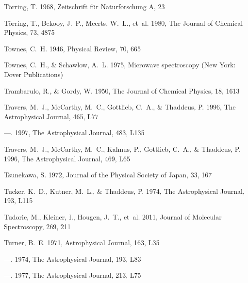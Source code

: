 \documentclass[twocolumn]{aastex631}
\begin{document}
\begin{thebibliography}{}
T{\"o}rring, T. 1968, Zeitschrift f{\"u}r Naturforschung A, 23

T{\"o}rring, T., Bekooy, J.~P., Meerts, W.~L., {et~al.} 1980, The Journal of
  Chemical Physics, 73, 4875

Townes, C.~H. 1946, Physical Review, 70, 665

Townes, C.~H., \& Schawlow, A.~L. 1975, {Microwave spectroscopy} (New York:
  Dover Publications)

Trambarulo, R., \& Gordy, W. 1950, The Journal of Chemical Physics, 18, 1613

Travers, M.~J., McCarthy, M.~C., Gottlieb, C.~A., \& Thaddeus, P.
  1996{}, The Astrophysical Journal, 465, L77

---. 1997, The Astrophysical Journal, 483, L135

Travers, M.~J., McCarthy, M.~C., Kalmus, P., Gottlieb, C.~A., \& Thaddeus, P.
  1996{}, The Astrophysical Journal, 469, L65

Tsunekawa, S. 1972, Journal of the Physical Society of Japan, 33, 167

Tucker, K.~D., Kutner, M.~L., \& Thaddeus, P. 1974, The Astrophysical Journal,
  193, L115

Tudorie, M., Kleiner, I., Hougen, J.~T., {et~al.} 2011, Journal of Molecular
  Spectroscopy, 269, 211

Turner, B.~E. 1971, Astrophysical Journal, 163, L35

---. 1974, The Astrophysical Journal, 193, L83

---. 1977, The Astrophysical Journal, 213, L75


\end{thebibliography}
\end{document}
